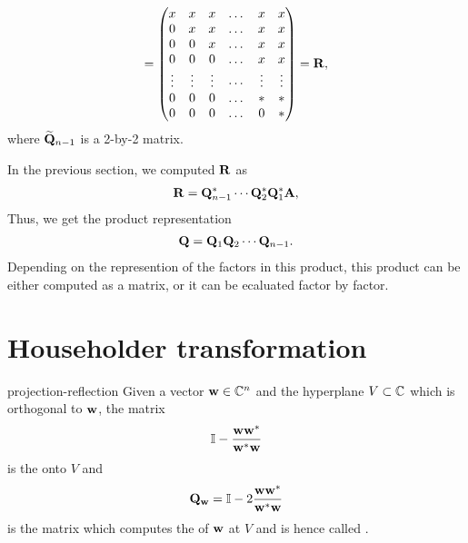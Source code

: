 \begin{intro}
\begin{gather}
    =
    \begin{pmatrix}
      x & x & x & \dots & x & x \\
      0 & x & x & \dots & x & x \\
      0 & 0 & x & \dots & x & x \\
      0 & 0 & 0 & \dots & x & x \\
      \vdots & \vdots & \vdots & \cdots & \vdots & \vdots \\
      0 & 0 & 0 & \dots & * & * \\
      0 & 0 & 0 & \dots & 0 & * \\
    \end{pmatrix} = \mathbf R,
  \end{gather}
  where $\widetilde{\mathbf Q}_{n-1}$ is a 2-by-2 matrix.
\end{intro}

\begin{intro}
  \label{sec:ortho:qr:q-product}
  In the previous section, we computed $\mathbf R$ as
  \begin{gather}
    \mathbf R = \mathbf Q_{n-1}^* \cdots \mathbf Q_{2}^*\mathbf Q_{1}^*\mathbf A,
  \end{gather}
  Thus, we get the product representation
  \begin{gather}
    \label{eq:ortho:1}
    \mathbf Q = \mathbf Q_{1} \mathbf Q_{2} \cdots \mathbf Q_{n-1}.
  \end{gather}
  Depending on the represention of the factors in this product, this
  product can be either computed as a matrix, or it can be ecaluated
  factor by factor.
\end{intro}

\section{Householder transformation}

\begin{Lemma}{projection-reflection}
  Given a vector $\mathbf w\in\mathbb C^n$ and the hyperplane $V\subset \mathbb C$ which is orthogonal to $\mathbf w$, the matrix
  \begin{gather}
    \mathbb I - \frac{\mathbf w\mathbf w^*}{\mathbf w^*\mathbf w}
  \end{gather}
  is the  onto $V$ and
  \begin{gather}
    \mathbf Q_{\mathbf w} = \mathbb I - 2\frac{\mathbf w\mathbf w^*}{\mathbf w^*\mathbf w}
  \end{gather}
  is the matrix which computes the  of $\mathbf w$ at $V$
  and is hence called .
\end{Lemma}

